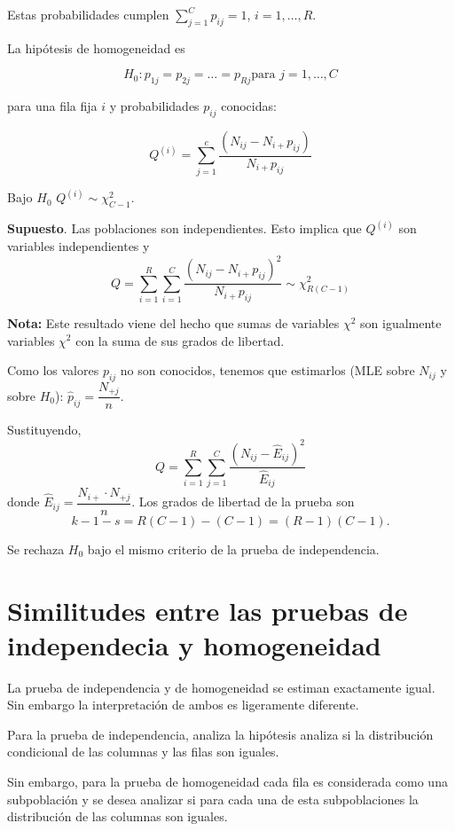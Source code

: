 \documentclass[
  12pt,
]{book}
\begin{document}
Estas probabilidades cumplen \(\sum_{j=1}^Cp_{ij} = 1\), \(i=1,\dots,R\).

La hipótesis de homogeneidad es

\[H_0: p_{1j} = p_{2j} = \dots = p_{Rj} \text{
para }j=1,\dots, C\]

para una fila fija \(i\) y probabilidades \(p_{ij}\) conocidas:

\[Q^{(i)}=\sum_{j=1}^c\dfrac{(N_{ij}-N_{i+}p_{ij})}{N_{i+}p_{ij}}\]

Bajo \(H_0\) \(Q^{(i)}\sim \chi^2_{C-1}\).

\textbf{Supuesto}. Las poblaciones son independientes. Esto implica que \(Q^{(i)}\) son
variables independientes y \[Q =
\sum_{i=1}^R\sum_{i=1}^C\dfrac{(N_{ij}-N_{i+}p_{ij})^2}{N_{i+}p_{ij}}\sim
\chi^2_{R(C-1)}\]

\textbf{Nota:} Este resultado viene del hecho que sumas de variables \(\chi ^{2}\) son
igualmente variables \(\chi ^{2}\) con la suma de sus grados de libertad.

Como los valores \(p_{ij}\) no son conocidos, tenemos que estimarlos (MLE sobre
\(N_{ij}\) y sobre \(H_0\)): \(\hat p_{ij} = \dfrac{N_{+j}}{n}\).

Sustituyendo, \[Q = \sum_{i=1}^R\sum_{j=1}^C\dfrac{(N_{ij}-\hat E_{ij})^2}{\hat
E_{ij}}\] donde \(\hat E_{ij} = \dfrac{N_{i+}\cdot N_{+j}}{n}\). Los grados de
libertad de la prueba son \[k-1-s = R(C-1)-(C-1) = (R-1)(C-1).\]

Se rechaza \(H_0\) bajo el mismo criterio de la prueba de independencia.

\hypertarget{similitudes-entre-las-pruebas-de-independecia-y-homogeneidad}{%
\section{Similitudes entre las pruebas de independecia y homogeneidad}\label{similitudes-entre-las-pruebas-de-independecia-y-homogeneidad}}

La prueba de independencia y de homogeneidad se estiman exactamente igual. Sin
embargo la interpretación de ambos es ligeramente diferente.

Para la prueba de independencia, analiza la hipótesis analiza si la
distribución condicional de las columnas y las filas son iguales.

Sin embargo, para la prueba de homogeneidad cada fila es considerada como una
subpoblación y se desea analizar si para cada una de esta subpoblaciones la
distribución de las columnas son iguales.
\end{document}
